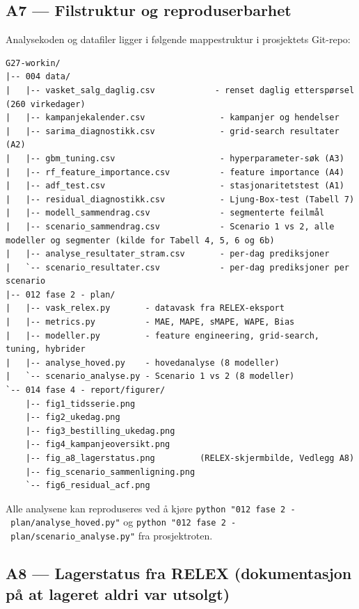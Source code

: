 \documentclass[
  norsk,
  11pt,
  a4paper,
]{article}
\begin{document}
\subsection{A7 --- Filstruktur og
reproduserbarhet}\label{a7-filstruktur-og-reproduserbarhet}

Analysekoden og datafiler ligger i følgende mappestruktur i prosjektets
Git-repo:

\begin{verbatim}
G27-workin/
|-- 004 data/
|   |-- vasket_salg_daglig.csv            - renset daglig etterspørsel (260 virkedager)
|   |-- kampanjekalender.csv               - kampanjer og hendelser
|   |-- sarima_diagnostikk.csv             - grid-search resultater (A2)
|   |-- gbm_tuning.csv                     - hyperparameter-søk (A3)
|   |-- rf_feature_importance.csv          - feature importance (A4)
|   |-- adf_test.csv                       - stasjonaritetstest (A1)
|   |-- residual_diagnostikk.csv           - Ljung-Box-test (Tabell 7)
|   |-- modell_sammendrag.csv              - segmenterte feilmål
|   |-- scenario_sammendrag.csv            - Scenario 1 vs 2, alle modeller og segmenter (kilde for Tabell 4, 5, 6 og 6b)
|   |-- analyse_resultater_stram.csv       - per-dag prediksjoner
|   `-- scenario_resultater.csv            - per-dag prediksjoner per scenario
|-- 012 fase 2 - plan/
|   |-- vask_relex.py       - datavask fra RELEX-eksport
|   |-- metrics.py          - MAE, MAPE, sMAPE, WAPE, Bias
|   |-- modeller.py         - feature engineering, grid-search, tuning, hybrider
|   |-- analyse_hoved.py    - hovedanalyse (8 modeller)
|   `-- scenario_analyse.py - Scenario 1 vs 2 (8 modeller)
`-- 014 fase 4 - report/figurer/
    |-- fig1_tidsserie.png
    |-- fig2_ukedag.png
    |-- fig3_bestilling_ukedag.png
    |-- fig4_kampanjeoversikt.png
    |-- fig_a8_lagerstatus.png         (RELEX-skjermbilde, Vedlegg A8)
    |-- fig_scenario_sammenligning.png
    `-- fig6_residual_acf.png
\end{verbatim}

Alle analysene kan reproduseres ved å kjøre
\texttt{python\ "012\ fase\ 2\ -\ plan/analyse\_hoved.py"} og
\texttt{python\ "012\ fase\ 2\ -\ plan/scenario\_analyse.py"} fra
prosjektroten.

\subsection{A8 --- Lagerstatus fra RELEX (dokumentasjon på at lageret
aldri var
utsolgt)}\label{a8-lagerstatus-fra-relex-dokumentasjon-puxe5-at-lageret-aldri-var-utsolgt}
\end{document}
